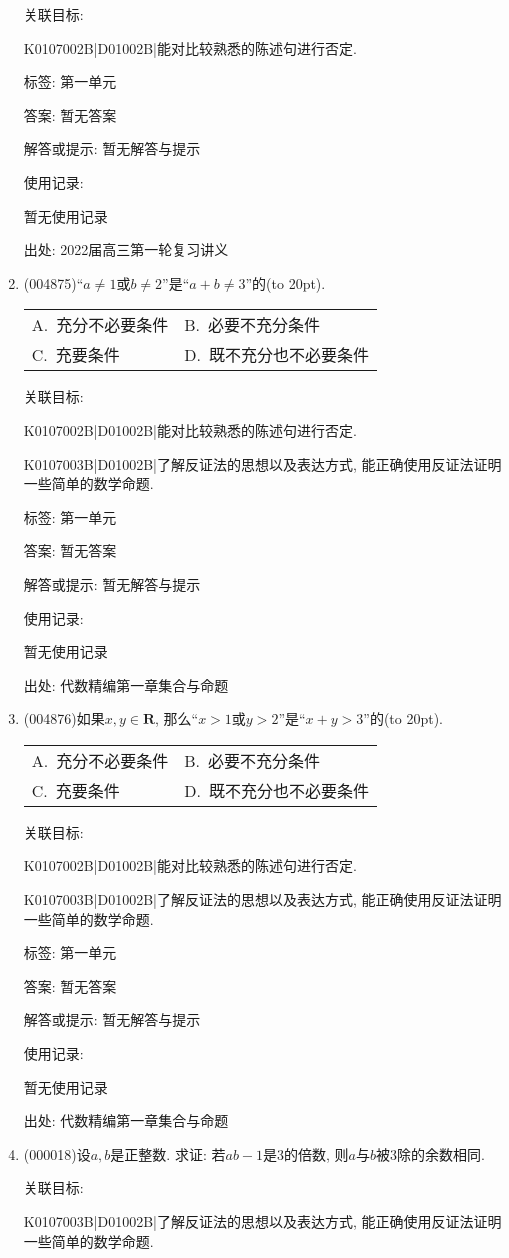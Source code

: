 \documentclass[10pt,a4paper]{article}
\newcommand{\bracket}[1]{(\hbox to #1pt{})}
\newcommand{\twoch}[4]{\par\begin{tabular}{p{.46\textwidth}p{.46\textwidth}}
A.~#1& B.~#2\\
C.~#3& D.~#4
\end{tabular}}
\begin{document}
\begin{enumerate}[1.]
关联目标:

K0107002B|D01002B|能对比较熟悉的陈述句进行否定.



标签: 第一单元

答案: 暂无答案

解答或提示: 暂无解答与提示

使用记录:

暂无使用记录


出处: 2022届高三第一轮复习讲义
\item { (004875)}``$a\ne 1$或$b\ne 2$''是``$a+b\ne 3$''的\bracket{20}.
\twoch{充分不必要条件}{必要不充分条件}{充要条件}{既不充分也不必要条件}


关联目标:

K0107002B|D01002B|能对比较熟悉的陈述句进行否定.

K0107003B|D01002B|了解反证法的思想以及表达方式, 能正确使用反证法证明一些简单的数学命题.



标签: 第一单元

答案: 暂无答案

解答或提示: 暂无解答与提示

使用记录:

暂无使用记录


出处: 代数精编第一章集合与命题
\item { (004876)}如果$x,y\in \mathbf{R}$, 那么``$x>1$或$y>2$''是``$x+y>3$''的\bracket{20}.
\twoch{充分不必要条件}{必要不充分条件}{充要条件}{既不充分也不必要条件}


关联目标:

K0107002B|D01002B|能对比较熟悉的陈述句进行否定.

K0107003B|D01002B|了解反证法的思想以及表达方式, 能正确使用反证法证明一些简单的数学命题.



标签: 第一单元

答案: 暂无答案

解答或提示: 暂无解答与提示

使用记录:

暂无使用记录


出处: 代数精编第一章集合与命题
\item { (000018)}设$a,b$是正整数. 求证: 若$ab-1$是$3$的倍数, 则$a$与$b$被$3$除的余数相同.


关联目标:

K0107003B|D01002B|了解反证法的思想以及表达方式, 能正确使用反证法证明一些简单的数学命题.




\end{enumerate}
\end{document}
